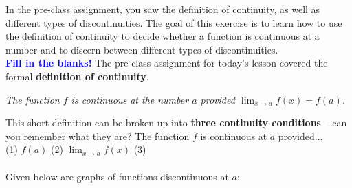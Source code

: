 \documentclass[10pt]{article}
\begin{document}
In the pre-class assignment, you saw the definition of continuity, as well as different types of discontinuities. The goal of this exercise is to learn how to use the definition of continuity to decide whether a function is continuous at a number and to discern between different types of discontinuities.\\

{\bf \textcolor{blue}{Fill in the blanks!}} The pre-class assignment for today's lesson covered the formal {\bf definition of continuity}. 
\begin{center}
{\it The function $f$ is continuous at the number $a$ provided $\displaystyle\lim_{x\to a} f(x)=f(a)$.} \\ %
\end{center}

\bigskip

This short definition can be broken up into {\bf three continuity conditions} -- can you remember what they are? The function $f$ is continuous at $a$ provided...  \\

(1) $f(a)$   \hfill
%
(2) $\displaystyle\lim_{x\to a}f(x)$ \hfill
%
(3)  \\[0.3in]

\\
{} Given below are graphs of functions discontinuous at $a$:\\
\end{document}
